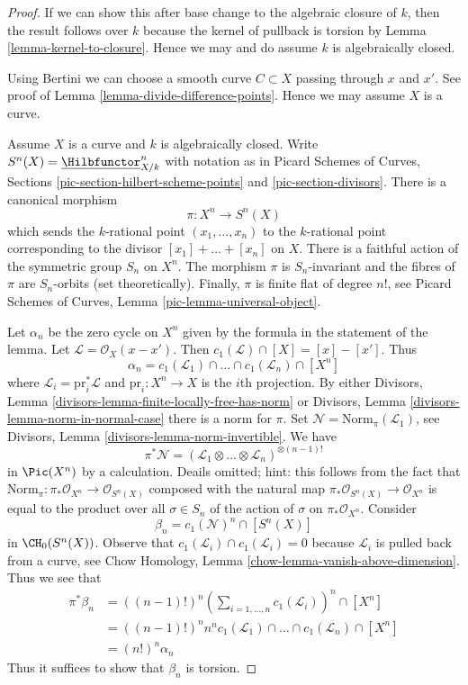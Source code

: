\begin{proof}
If we can show this after base change to the algebraic closure of $k$,
then the result follows over $k$ because the kernel of pullback
is torsion by Lemma \ref{lemma-kernel-to-closure}.
Hence we may and do assume $k$ is algebraically closed.

\medskip\noindent
Using Bertini we can choose a smooth curve $C \subset X$ passing through
$x$ and $x'$. See proof of Lemma \ref{lemma-divide-difference-points}.
Hence we may assume $X$ is a curve.

\medskip\noindent
Assume $X$ is a curve and $k$ is algebraically closed.
Write $S^n(X) = \underline{\Hilbfunctor}^n_{X/k}$ with notation as in
Picard Schemes of Curves, Sections \ref{pic-section-hilbert-scheme-points}
and \ref{pic-section-divisors}. There is a canonical morphism
$$
\pi : X^n \longrightarrow S^n(X)
$$
which sends the $k$-rational point $(x_1, \ldots, x_n)$ to the $k$-rational
point corresponding to the divisor $[x_1] + \ldots + [x_n]$ on $X$.
There is a faithful action of the symmetric group $S_n$ on $X^n$.
The morphism $\pi$ is $S_n$-invariant and the fibres of $\pi$ are
$S_n$-orbits (set theoretically). Finally, $\pi$ is finite flat of
degree $n!$, see Picard Schemes of Curves, Lemma
\ref{pic-lemma-universal-object}.

\medskip\noindent
Let $\alpha_n$ be the zero cycle on $X^n$ given by the formula in the
statement of the lemma. Let $\mathcal{L} = \mathcal{O}_X(x - x')$. Then
$c_1(\mathcal{L}) \cap [X] = [x] - [x']$. Thus
$$
\alpha_n = c_1(\mathcal{L}_1) \cap \ldots \cap c_1(\mathcal{L}_n) \cap [X^n]
$$
where $\mathcal{L}_i = \text{pr}_i^*\mathcal{L}$ and $\text{pr}_i : X^n \to X$
is the $i$th projection. By either
Divisors, Lemma \ref{divisors-lemma-finite-locally-free-has-norm} or
Divisors, Lemma \ref{divisors-lemma-norm-in-normal-case}
there is a norm for $\pi$. Set
$\mathcal{N} = \text{Norm}_\pi(\mathcal{L}_1)$, 
see Divisors, Lemma \ref{divisors-lemma-norm-invertible}. We have
$$
\pi^*\mathcal{N} =
(\mathcal{L}_1 \otimes \ldots \otimes \mathcal{L}_n)^{\otimes (n - 1)!}
$$
in $\Pic(X^n)$ by a calculation. Deails omitted; hint: this follows from
the fact that
$\text{Norm}_\pi : \pi_*\mathcal{O}_{X^n} \to \mathcal{O}_{S^n(X)}$
composed with the natural map $\pi_*\mathcal{O}_{S^n(X)} \to \mathcal{O}_{X^n}$
is equal to the product over all $\sigma \in S_n$ of the action of
$\sigma$ on $\pi_*\mathcal{O}_{X^n}$. Consider
$$
\beta_n = c_1(\mathcal{N})^n \cap [S^n(X)]
$$
in $\CH_0(S^n(X))$. Observe that
$c_1(\mathcal{L}_i) \cap c_1(\mathcal{L}_i) = 0$
because $\mathcal{L}_i$ is pulled back from a curve, see
Chow Homology, Lemma \ref{chow-lemma-vanish-above-dimension}. Thus we see that
\begin{align*}
\pi^*\beta_n
& =
((n - 1)!)^n
(\sum\nolimits_{i = 1, \ldots, n} c_1(\mathcal{L}_i))^n \cap [X^n] \\
& =
((n - 1)!)^n n^n 
c_1(\mathcal{L}_1) \cap \ldots \cap c_1(\mathcal{L}_n) \cap [X^n] \\
& =
(n!)^n \alpha_n
\end{align*}
Thus it suffices to show that $\beta_n$ is torsion.


\end{proof}

